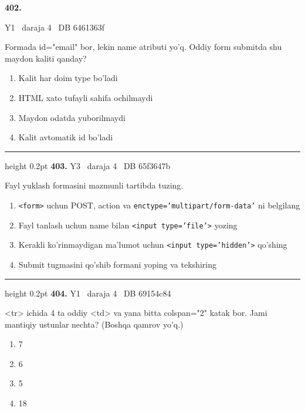 \documentclass[10pt,a4paper,oneside]{article}
\begin{document}
\hypertarget{q402}{\textbf{\color{ink}402.}}  {\color{muted}\scriptsize Y1 \textbullet\ daraja 4 \textbullet\ DB 6461363f}
\par
Formada id="email" bor, lekin name atributi yo'q. Oddiy form submitda shu maydon kaliti qanday?
\begin{enumerate}[label=\Alph*),leftmargin=9mm]
\item Kalit har doim type bo'ladi
\item HTML xato tufayli sahifa ochilmaydi
\item Maydon odatda yuborilmaydi
\item Kalit avtomatik id bo'ladi
\end{enumerate}
\vspace{2mm}\hrule height 0.2pt \vspace{4mm}
\hypertarget{q403}{\textbf{\color{ink}403.}}  {\color{muted}\scriptsize Y3 \textbullet\ daraja 4 \textbullet\ DB 65f3647b}
\par
Fayl yuklash formasini mazmunli tartibda tuzing.
\begin{enumerate}[label=\Alph*),leftmargin=9mm]
\item \texttt{\textless{}form\textgreater{}} uchun POST, action va \texttt{enctype='multipart/form-data'} ni belgilang
\item Fayl tanlash uchun name bilan \texttt{\textless{}input type='file'\textgreater{}} yozing
\item Kerakli ko'rinmaydigan ma'lumot uchun \texttt{\textless{}input type='hidden'\textgreater{}} qo'shing
\item Submit tugmasini qo'shib formani yoping va tekshiring
\end{enumerate}
\vspace{2mm}\hrule height 0.2pt \vspace{4mm}
\hypertarget{q404}{\textbf{\color{ink}404.}}  {\color{muted}\scriptsize Y1 \textbullet\ daraja 4 \textbullet\ DB 69154c84}
\par
\textless{}tr\textgreater{} ichida 4 ta oddiy \textless{}td\textgreater{} va yana bitta colspan="2" katak bor. Jami mantiqiy ustunlar nechta? (Boshqa qamrov yo'q.)
\begin{enumerate}[label=\Alph*),leftmargin=9mm]
\item 7
\item 6
\item 5
\item 18
\end{enumerate}
\end{document}
